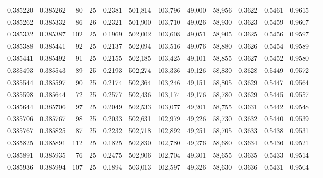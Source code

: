 \begin{tabular}{rrrrrrrrrrrrr}
0.385220 & 0.385262 &    80 &  25 &                                     0.2381 & 501,814 & 103,796 &  49,000 &  58,956 & 0.3622 & 0.5461 & 0.9615 \\
0.385262 & 0.385332 &    86 &  26 &                                     0.2321 & 501,900 & 103,710 &  49,026 &  58,930 & 0.3623 & 0.5459 & 0.9607 \\
0.385332 & 0.385387 &   102 &  25 &                                     0.1969 & 502,002 & 103,608 &  49,051 &  58,905 & 0.3625 & 0.5456 & 0.9597 \\
0.385388 & 0.385441 &    92 &  25 &                                     0.2137 & 502,094 & 103,516 &  49,076 &  58,880 & 0.3626 & 0.5454 & 0.9589 \\
0.385441 & 0.385492 &    91 &  25 &                                     0.2155 & 502,185 & 103,425 &  49,101 &  58,855 & 0.3627 & 0.5452 & 0.9580 \\
0.385493 & 0.385543 &    89 &  25 &                                     0.2193 & 502,274 & 103,336 &  49,126 &  58,830 & 0.3628 & 0.5449 & 0.9572 \\
0.385544 & 0.385597 &    90 &  25 &                                     0.2174 & 502,364 & 103,246 &  49,151 &  58,805 & 0.3629 & 0.5447 & 0.9564 \\
0.385598 & 0.385644 &    72 &  25 &                                     0.2577 & 502,436 & 103,174 &  49,176 &  58,780 & 0.3629 & 0.5445 & 0.9557 \\
0.385644 & 0.385706 &    97 &  25 &                                     0.2049 & 502,533 & 103,077 &  49,201 &  58,755 & 0.3631 & 0.5442 & 0.9548 \\
0.385706 & 0.385767 &    98 &  25 &                                     0.2033 & 502,631 & 102,979 &  49,226 &  58,730 & 0.3632 & 0.5440 & 0.9539 \\
0.385767 & 0.385825 &    87 &  25 &                                     0.2232 & 502,718 & 102,892 &  49,251 &  58,705 & 0.3633 & 0.5438 & 0.9531 \\
0.385825 & 0.385891 &   112 &  25 &                                     0.1825 & 502,830 & 102,780 &  49,276 &  58,680 & 0.3634 & 0.5436 & 0.9521 \\
0.385891 & 0.385935 &    76 &  25 &                                     0.2475 & 502,906 & 102,704 &  49,301 &  58,655 & 0.3635 & 0.5433 & 0.9514 \\
0.385936 & 0.385994 &   107 &  25 &                                     0.1894 & 503,013 & 102,597 &  49,326 &  58,630 & 0.3636 & 0.5431 & 0.9504 \\

\end{tabular}
